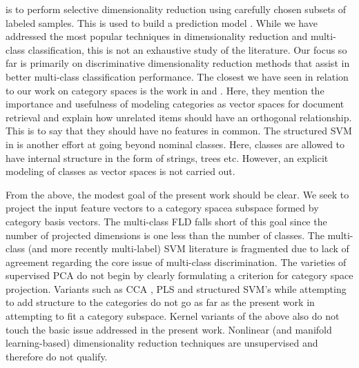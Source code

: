 is to perform selective dimensionality reduction using carefully chosen
subsets of labeled samples. This is used to build a prediction model
\citep{bair2012prediction}. While we have addressed the most popular
techniques in dimensionality reduction and multi-class classification,
this is not an exhaustive study of the literature. Our focus so far
is primarily on discriminative dimensionality reduction methods that
assist in better multi-class classification performance. The closest
we have seen in relation to our work on category spaces is the work
in \citep{widdows2004geometry} and \citep{widdows2003orthogonal}.
Here, they mention the importance and usefulness of modeling categories
as vector spaces for document retrieval and explain how unrelated
items should have an orthogonal relationship. This is to say that
they should have no features in common. The structured SVM in \citep{tsochantaridis2004support}
is another effort at going beyond nominal classes. Here, classes are
allowed to have internal structure in the form of strings, trees etc.
However, an explicit modeling of classes as vector spaces is not carried
out. 

From the above, the modest goal of the present work should be clear.
We seek to project the input feature vectors to a category space\textemdash a
subspace formed by category basis vectors. The multi-class FLD falls
short of this goal since the number of projected dimensions is one
less than the number of classes. The multi-class (and more recently
multi-label) SVM \citep{ji2009linear} literature is fragmented due
to lack of agreement regarding the core issue of multi-class discrimination.
The varieties of supervised PCA do not begin by clearly formulating
a criterion for category space projection. Variants such as CCA \citep{johnson2002applied,sun2011canonical},
PLS \citep{sun2013multi} and structured SVM's \citep{tsochantaridis2004support}
while attempting to add structure to the categories do not go as far
as the present work in attempting to fit a category subspace. Kernel
variants of the above also do not touch the basic issue addressed
in the present work. Nonlinear (and manifold learning-based) dimensionality
reduction techniques are unsupervised and therefore do not qualify.
